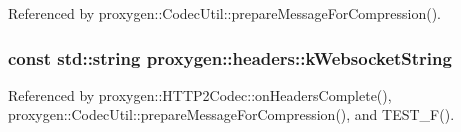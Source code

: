 Referenced by proxygen\+::\+Codec\+Util\+::prepare\+Message\+For\+Compression().

\subsubsection[{k\+Websocket\+String}]{\setlength{\rightskip}{0pt plus 5cm}const std\+::string proxygen\+::headers\+::k\+Websocket\+String}\label{namespaceproxygen_1_1headers_a0213b8fbd121644319ca9f401ec02a33}


Referenced by proxygen\+::\+H\+T\+T\+P2\+Codec\+::on\+Headers\+Complete(), proxygen\+::\+Codec\+Util\+::prepare\+Message\+For\+Compression(), and T\+E\+S\+T\+\_\+\+F().

